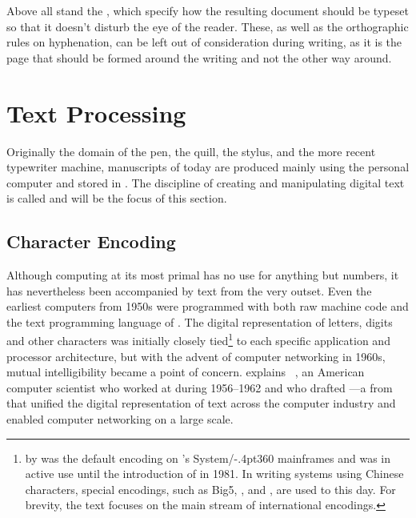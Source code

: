 Above all stand the ,
which specify how the resulting document should be typeset so that it doesn't
disturb the eye of the reader. These, as well as the orthographic rules on
hyphenation, can be left out of consideration during writing, as it is the page
that should be formed around the writing and not the other way around.

\section{Text Processing}
Originally the domain of the pen, the quill, the stylus, and the more recent
typewriter machine, manuscripts of today are produced mainly using the personal
computer and stored in . The discipline of creating and
manipulating digital text is called  and will be the focus
of this section.

\subsection{Character Encoding}
Although computing at its most primal has no use for anything but numbers, it
has nevertheless been accompanied by text from the very outset. Even the
earliest computers from 1950s were programmed with both raw machine code and
the text programming language of . The digital representation
of letters, digits and other characters was initially closely tied\footnote{
   by  was the default encoding on
  's System/\kern-.4pt360 mainframes and was in active use until
  the introduction of  in 1981. In writing systems using Chinese
  characters, special encodings, such as Big5, , and ,
  are used to this day. For brevity, the text focuses on the main stream of
  international encodings.}
to each specific application and processor architecture, but with the advent of
computer networking in 1960s, mutual intelligibility became a point of concern.
 explains ~\cite{brandel99}, an American computer scientist who worked at
 during 1956--1962 and who drafted ---a
 from \citeyear{asa63} that unified the digital
representation of text across the computer industry and enabled computer
networking on a large scale.


